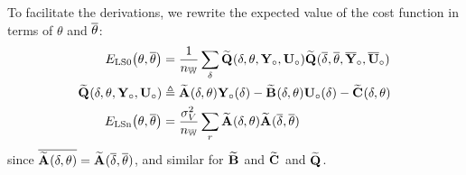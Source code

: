 To facilitate the derivations, we rewrite the expected value of the cost function in terms of $\theta$ and $\conj{\theta}$:
\begin{align}
   \ELSCost[0]{\theta,\conj{\theta}} & =
      \frac{1}{\nWind}
           \sum_{\dW}
           \LocalModel{Q}(      \dW,        \LocalVector{\theta},  \true{      \LocalVector{Y}},  \true{      \LocalVector{U} })
           \LocalModel{Q}(\conj{\dW}, \conj{\LocalVector{\theta}}, \true{\conj{\LocalVector{Y}}}, \true{\conj{\LocalVector{U}}})
   \\
   \LocalModel{Q}(\dW, \LocalVector{\theta},  \true{\LocalVector{Y}},  \true{ \LocalVector{U} }) & \isdef
                 \LocalModel{A}(\dW, \LocalVector{\theta}) \true{\LocalVector{Y}}(\dW)
               - \LocalModel{B}(\dW, \LocalVector{\theta}) \true{\LocalVector{U}}(\dW)
               - \LocalModel{C}(\dW, \LocalVector{\theta})
    \\             
    \ELSCost[n]{\theta,\conj{\theta}} & =
              \frac{\sigma_V^2}{\nWind} 
                     \sum_{r} 
                               \LocalModel{A}(      \dW,        \LocalVector{\theta} ) 
                               \LocalModel{A}(\conj{\dW}, \conj{\LocalVector{\theta}}) 
\end{align}
since $\conj{ \LocalModel{A}(\dW,\theta)} =  \LocalModel{A}(\conj{\dW},\conj{\theta}) $, and similar for $\LocalModel{B}$ and $\LocalModel{C}$ and $\LocalModel{Q}$.

